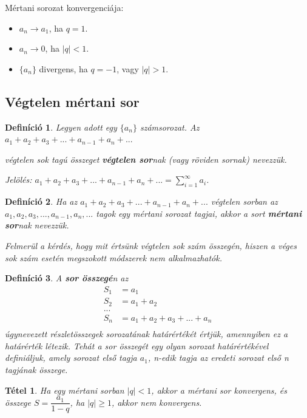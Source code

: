 \documentclass[12pt,a4paper]{article}
\newtheorem{theorem}{Tétel} [section]
\newtheorem{definition}{Definíció} [section]
\begin{document}
Mértani sorozat konvergenciája:
\begin{itemize}
\item $a_n\to a_1$, ha $q=1$.
\item $a_n\to 0$, ha $|q|<1$.
\item $\{a_n\}$ divergens, ha $q=-1$, vagy $|q|>1$.
\end{itemize}

\subsection{Végtelen mértani sor}

\begin{definition}
Legyen adott egy $\{a_n\}$ számsorozat. Az $a_1+a_2+a_3+...+a_{n-1}+a_n+...$

végtelen sok tagú összeget \textbf{végtelen sor}nak (vagy röviden sornak) nevezzük.

Jelölés: $a_1+a_2+a_3+...+a_{n-1}+a_n+...=\sum\limits^\infty_{i=1}a_i$.
\end{definition}

\begin{definition}
Ha az $a_1+a_2+a_3+...+a_{n-1}+a_n+...$ végtelen sorban az $a_1, a_2, a_3, ..., a_{n-1}, a_n, ...$ tagok egy mértani sorozat tagjai, akkor a sort \textbf{mértani sor}nak nevezzük.

Felmerül a kérdés, hogy mit értsünk végtelen sok szám összegén, hiszen a véges sok szám esetén megszokott módszerek nem alkalmazhatók.
\end{definition}

\begin{definition}
A \textbf{sor összegé}n az
\begin{align*}
S_1&=a_1 \\
S_2&=a_1+a_2 \\
... \\
S_n&=a_1+a_2+a_3+...+a_n \\
\end{align*}
úgynevezett részletösszegek sorozatának határértékét értjük, amennyiben ez a határérték létezik. Tehát a sor összegét egy olyan sorozat határértékével definiáljuk, amely sorozat első tagja $a_1$, n-edik tagja az eredeti sorozat első n tagjának összege.
\end{definition}
\begin{theorem}
Ha egy mértani sorban $|q|<1$, akkor a mértani sor konvergens, és összege $S=\dfrac{a_1}{1-q}$, ha $|q|\geq 1$, akkor nem konvergens.
\end{theorem}
\newpage
\end{document}
